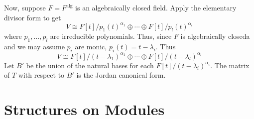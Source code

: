 \documentclass[11pt, a4paper]{memoir}
\theoremstyle{change}
\theoremstyle{plain}
\theoremstyle{nonumberplain}
\numberwithin{equation}{section}
\begin{document}
Now, suppose $F=F^{\text{alg}}$ is an algebraically closed field.
Apply the elementary divisor form to get
\begin{equation*}
    V\cong F[t]/p_1(t)^{\alpha_1}\oplus\cdots\oplus F[t]/p_l(t)^{\alpha_l}
\end{equation*}
where $p_1,\ldots,p_l$ are irreducible polynomials.
Thus, since $F$ is algebraically closeda and we may assume $p_i$ are monic, $p_i(t)=t-\lambda_i$.
Thus
\begin{equation*}
    V\cong F[t]/(t-\lambda_1)^{\alpha_1}\oplus\cdots\oplus F[t]/(t-\lambda_l)^{\alpha_l}
\end{equation*}
Let $B'$ be the union of the natural bases for each $F[t]/(t-\lambda_i)^{\alpha_i}$.
The matrix of $T$ with respect to $B'$ is the Jordan canonical form.
\chapter{Structures on Modules}
\end{document}
